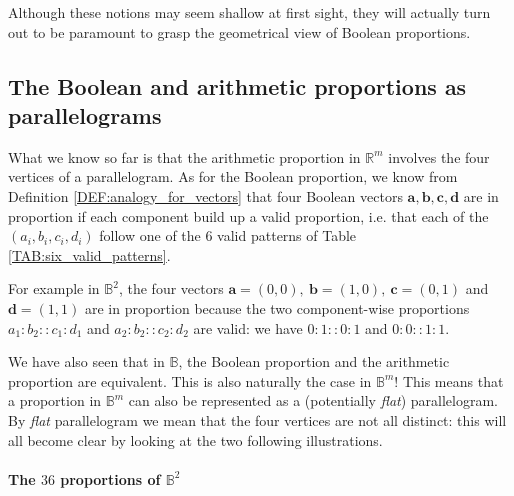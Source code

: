 Although these notions may seem shallow at first sight, they will actually turn
out to be paramount to grasp the geometrical view of Boolean proportions.

\subsection{The Boolean and arithmetic proportions as parallelograms}

What we know so far is that the arithmetic proportion in $\mathbb{R}^m$
involves the four vertices of a parallelogram. As for the Boolean proportion,
we know from Definition \ref{DEF:analogy_for_vectors} that four Boolean vectors
$\mathbf{a}, \mathbf{b}, \mathbf{c}, \mathbf{d}$ are in proportion if each
component build up a valid proportion, i.e. that each of the $(a_i, b_i, c_i,
d_i)$ follow one of the $6$ valid patterns of Table
\ref{TAB:six_valid_patterns}.
\begin{testexample}
For example in $\mathbb{B}^2$, the four vectors $\mathbf{a} = (0, 0),~
  \mathbf{b} = (1, 0),~ \mathbf{c} = (0, 1)$ and $\mathbf{d} = (1, 1)$ are in
  proportion because the two component-wise proportions $a_1 : b_2 :: c_1 :
  d_1$ and $a_2 : b_2 :: c_2:d_2$ are valid: we have $0: 1 :: 0: 1$ and
  $0:0::1:1$.
\end{testexample}

We have also seen that in $\mathbb{B}$, the Boolean
proportion and the arithmetic proportion are equivalent. This is also naturally
the case in $\mathbb{B}^m$! This means that a proportion in $\mathbb{B}^m$ can
also be represented as a (potentially \textit{flat}) parallelogram. By
\textit{flat} parallelogram we mean that the four vertices are not all
distinct: this will all become clear by looking at the two following
illustrations.

\paragraph{The $36$ proportions of $\mathbb{B}^2$\\}

